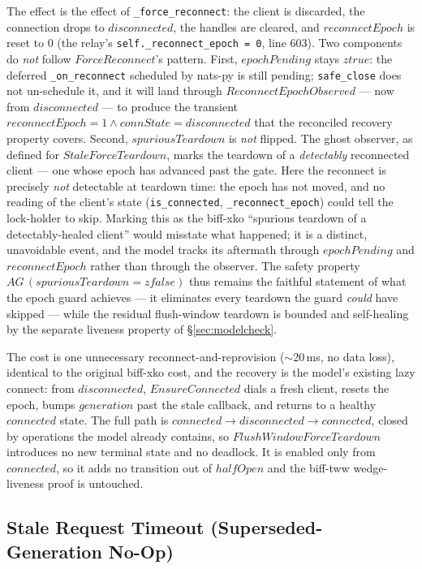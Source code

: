 \documentclass[a4paper,10pt,fleqn]{article}
\begin{document}
The effect is the effect of \texttt{\_force\_reconnect}: the client is
discarded, the connection drops to $disconnected$, the handles are
cleared, and $reconnectEpoch$ is reset to $0$ (the relay's
\texttt{self.\_reconnect\_epoch = 0}, line 603).  Two components do
\emph{not} follow $ForceReconnect$'s pattern.  First, $epochPending$ stays
$ztrue$: the deferred \texttt{\_on\_reconnect} scheduled by nats-py is
still pending; \texttt{safe\_close} does not un-schedule it, and it will
land through $ReconnectEpochObserved$ --- now from $disconnected$ --- to
produce the transient $reconnectEpoch = 1 \land connState = disconnected$
that the reconciled recovery property covers.  Second, $spuriousTeardown$
is \emph{not} flipped.  The ghost observer, as defined for
$StaleForceTeardown$, marks the teardown of a \emph{detectably}
reconnected client --- one whose epoch has advanced past the gate.  Here
the reconnect is precisely \emph{not} detectable at teardown time: the
epoch has not moved, and no reading of the client's state
(\texttt{is\_connected}, \texttt{\_reconnect\_epoch}) could tell the
lock-holder to skip.  Marking this as the biff-xko ``spurious teardown of
a detectably-healed client'' would misstate what happened; it is a
distinct, unavoidable event, and the model tracks its aftermath through
$epochPending$ and $reconnectEpoch$ rather than through the observer.
The safety property $AG\,(spuriousTeardown = zfalse)$ thus remains the
faithful statement of what the epoch guard achieves --- it eliminates
every teardown the guard \emph{could} have skipped --- while the residual
flush-window teardown is bounded and self-healing by the separate
liveness property of \S\ref{sec:modelcheck}.

The cost is one unnecessary reconnect-and-reprovision ($\sim$20\,ms, no
data loss), identical to the original biff-xko cost, and the recovery is
the model's existing lazy connect: from $disconnected$, $EnsureConnected$
dials a fresh client, resets the epoch, bumps $generation$ past the stale
callback, and returns to a healthy $connected$ state.  The full path is
$connected \to disconnected \to connected$, closed by operations the
model already contains, so $FlushWindowForceTeardown$ introduces no new
terminal state and no deadlock.  It is enabled only from $connected$, so
it adds no transition out of $halfOpen$ and the biff-tww wedge-liveness
proof is untouched.

\subsection{Stale Request Timeout (Superseded-Generation No-Op)}
\end{document}
